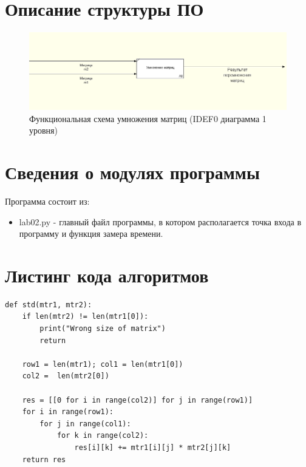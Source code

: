 \documentclass[12pt]{report}
\begin{document}
\section{Описание структуры ПО}
\begin{figure}[h]
	\centering
	\includegraphics[width=1.25\linewidth]{lab02ram}
	\caption{Функциональная схема умножения матриц (IDEF0 диаграмма 1 уровня)}
	\label{fig:mpr}
\end{figure}

\section{Сведения о модулях программы}
Программа состоит из:
\begin{itemize}
	\item lab02.py - главный файл программы, в котором располагается точка входа в программу и функция замера времени.
\end{itemize}

\section{Листинг кода алгоритмов}

\begin{lstlisting}[label=CodeStand,caption= Стандартный алгоритм умножения матриц]
def std(mtr1, mtr2):
	if len(mtr2) != len(mtr1[0]):
		print("Wrong size of matrix")
		return

	row1 = len(mtr1); col1 = len(mtr1[0])
	col2 =  len(mtr2[0])

	res = [[0 for i in range(col2)] for j in range(row1)]
	for i in range(row1):
		for j in range(col1):
			for k in range(col2):
				res[i][k] += mtr1[i][j] * mtr2[j][k]
	return res
\end{lstlisting}
\end{document}
